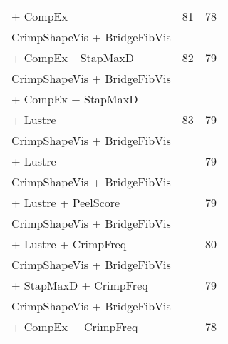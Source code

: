 \begin{table}[htp]
\begin{tabular}{|p{2.2in}|p{1.2in}|p{1.2in}|}
  + CompEx                     & 81 & 78 \\
  CrimpShapeVis + BridgeFibVis & & \\
  + CompEx +StapMaxD           & 82 & 79 \\
  CrimpShapeVis + BridgeFibVis & & \\
  + CompEx + StapMaxD           & & \\
  + Lustre                     & 83 & 79 \\
  CrimpShapeVis + BridgeFibVis & & \\
  + Lustre                     & & 79 \\
  CrimpShapeVis + BridgeFibVis & & \\
  + Lustre + PeelScore         & & 79 \\
  CrimpShapeVis + BridgeFibVis & & \\
  + Lustre + CrimpFreq         & & 80 \\
  CrimpShapeVis + BridgeFibVis & & \\
  + StapMaxD + CrimpFreq       & & 79 \\
  CrimpShapeVis + BridgeFibVis & & \\
  + CompEx + CrimpFreq         & & 78 \\
\hline 
\end{tabular} 
\end{table}


%
